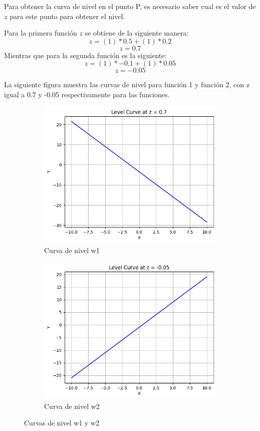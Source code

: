 \documentclass[12 pt]{article}
\begin{document}
\begin{enumerate}
Para obtener la curva de nivel en el punto P, es necesario saber cual es el valor de $z$ para este punto para obtener el nivel. 

Para la primera función  $z$ se obtiene de la siguiente manera:
\[
    z = (1)*0.5 + (1)*0.2
\]
\[
    z = 0.7
\]
Mientras que para la segunda función es la siguiente:
\[
    z = (1)*-0.1 + (1)*0.05
\]
\[
    z = -0.05
\]

La siguiente figura muestra las curvas de nivel para función 1 y función 2, con z igual a 0.7 y -0.05 respectivamente para las funciones.
\begin{figure}[H]
    \centering
    \begin{subfigure}[b]{0.45\linewidth}
        \centering
        \includegraphics[width=\linewidth]{img/level_w1.png}
        \caption{Curva de nivel w1}
        \label{fig:w1}
    \end{subfigure}
    \hfill
    \begin{subfigure}[b]{0.45\linewidth}
        \centering
        \includegraphics[width=\linewidth]{img/lrvel_w2.png}
        \caption{Curva de nivel w2}
        \label{fig:w2}
    \end{subfigure}
    \caption{Curvas de nivel w1 y w2}
    \label{fig:planos}
\end{figure}



\end{enumerate}
\end{document}
